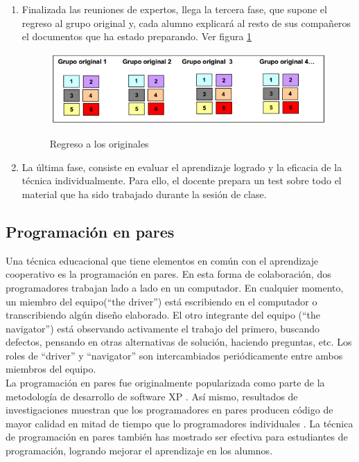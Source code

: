 \begin{enumerate}
    \item Finalizada las reuniones de expertos, llega la tercera fase, que supone el regreso al grupo original y, cada alumno explicará al resto de sus compañeros el documentos que ha estado preparando. Ver figura \ref{fig:jigsaw03}

\begin{figure}[h]
  \centering
  \includegraphics[scale=0.6]{figuras/jigsaw03.png}\\
  \caption{Regreso a los originales}\label{fig:jigsaw03}
\end{figure}

\item La última fase, consiste en evaluar el aprendizaje logrado y la eficacia de la técnica individualmente. Para ello, el docente prepara un test sobre todo el material que ha sido trabajado durante la sesión de clase.

\end{enumerate}

\subsection{Programación en pares}
Una técnica educacional que tiene elementos en común con el aprendizaje cooperativo es la programación en pares. En esta forma de colaboración, dos programadores trabajan lado a lado en un computador. En cualquier momento, un miembro del equipo(``the driver'') está escribiendo en el computador o transcribiendo algún diseño elaborado. El otro integrante del equipo (``the navigator'') está observando activamente el trabajo del primero, buscando defectos, pensando en otras alternativas de solución, haciendo preguntas, etc. Los roles de ``driver'' y ``navigator'' son intercambiados periódicamente entre ambos miembros del equipo.\\

La programación en pares fue originalmente popularizada como parte de la metodología de desarrollo de software XP \cite{beck_extreme_2000}. Así mismo, resultados de investigaciones muestran que los programadores en pares producen código de mayor calidad en mitad de tiempo que lo programadores individuales \cite{williams2000collaborative,williams_strengthening_2000}. La técnica de programación en pares también has mostrado ser efectiva para estudiantes de programación, logrando mejorar el aprendizaje en los alumnos\cite{mcdowell_effects_2002}.


